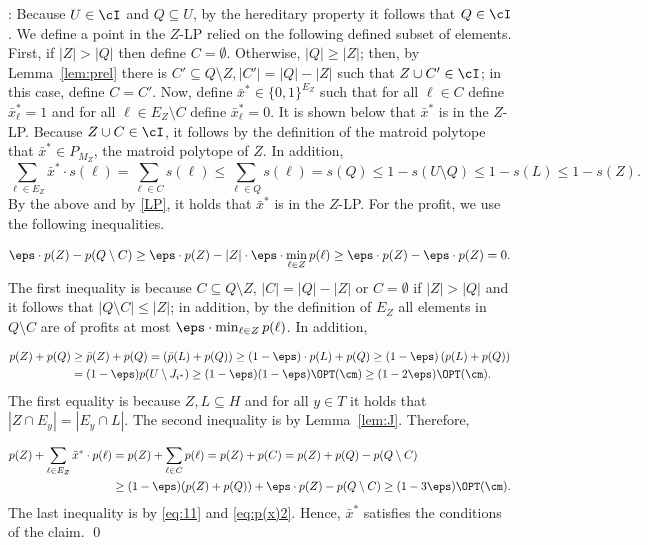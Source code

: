 		: 
		Because $U \in \cI$ and $Q \subseteq U$, by the hereditary property it follows that $Q \in \cI$. We define a point in the $Z$-LP relied on the following defined subset of elements. First, if $|Z| > |Q|$ then define $C = \emptyset$. Otherwise, $|Q| \geq |Z|$; then, by Lemma~\ref{lem:prel} there is $C' \subseteq Q \setminus Z, |C'|  = |Q| - |Z|$ such that $Z \cup C' \in \cI$; in this case, define $C = C'$. Now, define $\bar{x}^* \in \{0,1\}^{E_Z}$ such that for all $\ell \in C$ define $\bar{x}^*_{\ell} = 1$ and for all $\ell \in E_Z \setminus C$ define $\bar{x}^*_{\ell} = 0$. It is shown below that $\bar{x}^*$ is in the $Z$-LP. Because $Z \cup C \in \cI$, it follows by the definition of the matroid polytope that $\bar{x}^* \in P_{M_Z}$, the matroid polytope of $Z$. In addition, $$\sum_{\ell \in E_Z} \bar{x}^* \cdot s(\ell) = \sum_{\ell \in C} s(\ell) \leq \sum_{\ell \in Q} s(\ell) = s(Q) \leq 1-s(U \setminus Q) \leq 1-s(L) \leq 1-s(Z).$$ By the above and by \eqref{LP}, it holds that $\bar{x}^*$ is in the $Z$-LP. For the profit, we use the following inequalities.
		
		\begin{equation}
			\label{eq:11}
			\begin{aligned}
				\eps \cdot p(Z)-p(Q \setminus C) \geq \eps \cdot p(Z)- |Z| \cdot \eps \cdot  \min_{\ell \in Z} p(\ell) \geq \eps \cdot p(Z)-\eps \cdot p(Z) = 0.
			\end{aligned}
		\end{equation} The first inequality is because $C \subseteq Q \setminus Z$, $|C|  = |Q| - |Z|$ or $C = \emptyset$ if $|Z| > |Q|$ and it follows that $|Q \setminus C| \leq |Z|$; in addition, by the definition of $E_Z$ all elements in $Q \setminus C$ are of profits at most $\eps \cdot \min_{\ell \in Z} p(\ell)$. In addition, 
		
		\begin{equation}
			\label{eq:p(x)2}
			\begin{aligned}
				p(Z)+p(Q) \geq{} & \bar{p}(Z)+p(Q)  =  (\bar{p}(L)+p(Q)) \geq  (1-\eps)\cdot p(L)+p(Q) \geq  (1-\eps) \left( p(L)+p(Q)\right) \\ = {} &  (1-\eps)  p(U \setminus J_{i^*}) \geq (1-\eps) (1-\eps)\OPT(\cm) \geq (1-2\eps)  \OPT(\cm). 
			\end{aligned}
		\end{equation} The first equality is because $Z,L \subseteq H$ and for all $y \in T$ it holds that $|Z \cap E_y| = |E_y \cap L|$. The second inequality is by Lemma~\ref{lem:J}. Therefore,
		
		\begin{equation*}
			\label{eq:p(x)}
			\begin{aligned}
				p(Z)+\sum_{\ell \in E_Z} \bar{x}^* \cdot p(\ell) ={} & p(Z)+\sum_{\ell \in C} p(\ell) = p(Z)+p(C) = p(Z)+p(Q) - p(Q \setminus C) \\ \geq{} & (1-\eps) (p(Z)+p(Q))+\eps \cdot p(Z)-p(Q \setminus C)  \geq (1-3\eps) \OPT(\cm).
			\end{aligned}
		\end{equation*} The last inequality is by \eqref{eq:11} and \eqref{eq:p(x)2}.  Hence, $\bar{x}^*$ satisfies the conditions of the claim. \qed